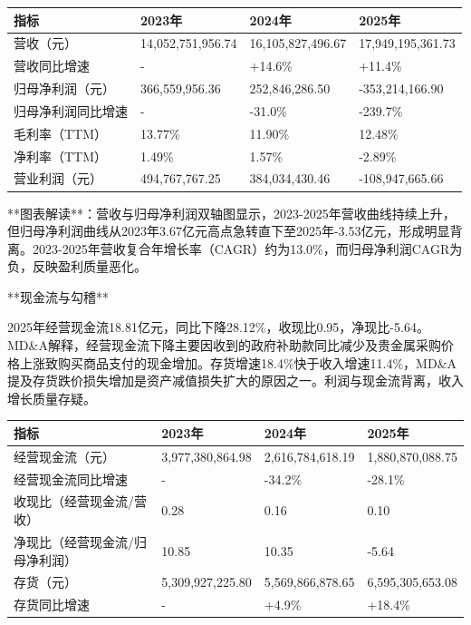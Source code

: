 \documentclass[12pt,a4paper]{article}
\begin{document}
\begin{table}[htbp]
\centering
\begin{tabular}{llll}
\toprule
指标 & 2023年 & 2024年 & 2025年 \\
\midrule
营收（元） & 14,052,751,956.74 & 16,105,827,496.67 & 17,949,195,361.73 \\
营收同比增速 & - & +14.6\% & +11.4\% \\
归母净利润（元） & 366,559,956.36 & 252,846,286.50 & -353,214,166.90 \\
归母净利润同比增速 & - & -31.0\% & -239.7\% \\
毛利率（TTM） & 13.77\% & 11.90\% & 12.48\% \\
净利率（TTM） & 1.49\% & 1.57\% & -2.89\% \\
营业利润（元） & 494,767,767.25 & 384,034,430.46 & -108,947,665.66 \\
\bottomrule
\end{tabular}
\end{table}


**图表解读**：营收与归母净利润双轴图显示，2023-2025年营收曲线持续上升，但归母净利润曲线从2023年3.67亿元高点急转直下至2025年-3.53亿元，形成明显背离。2023-2025年营收复合年增长率（CAGR）约为13.0\%，而归母净利润CAGR为负，反映盈利质量恶化。

**现金流与勾稽**

2025年经营现金流18.81亿元，同比下降28.12\%，收现比0.95，净现比-5.64。MD\&A解释，经营现金流下降主要因收到的政府补助款同比减少及贵金属采购价格上涨致购买商品支付的现金增加。存货增速18.4\%快于收入增速11.4\%，MD\&A提及存货跌价损失增加是资产减值损失扩大的原因之一。利润与现金流背离，收入增长质量存疑。

\begin{table}[htbp]
\centering
\begin{tabular}{llll}
\toprule
指标 & 2023年 & 2024年 & 2025年 \\
\midrule
经营现金流（元） & 3,977,380,864.98 & 2,616,784,618.19 & 1,880,870,088.75 \\
经营现金流同比增速 & - & -34.2\% & -28.1\% \\
收现比（经营现金流/营收） & 0.28 & 0.16 & 0.10 \\
净现比（经营现金流/归母净利润） & 10.85 & 10.35 & -5.64 \\
存货（元） & 5,309,927,225.80 & 5,569,866,878.65 & 6,595,305,653.08 \\
存货同比增速 & - & +4.9\% & +18.4\% \\
\bottomrule
\end{tabular}
\end{table}
\end{document}
